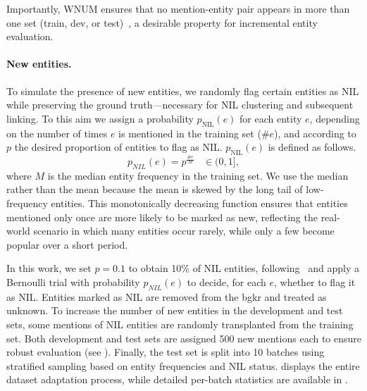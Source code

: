 Importantly, WNUM ensures that no mention-entity pair appears in more than one set (train, dev, or test)~\cite{Onoe_Durrett_2020}, a desirable property for incremental entity evaluation.

\paragraph{New entities.}
To simulate the presence of new entities, we randomly flag certain entities as NIL while preserving the ground truth---necessary for NIL clustering and subsequent linking. To this aim we assign a probability $p_\text{NIL}(e)$ for each entity $e$, depending on the number of times $e$ is mentioned in the training set ($\#e$), and according to $p$ the desired proportion of entities to flag as NIL. $p_\text{NIL}(e)$ is defined as follows.
\begin{equation}
p_{NIL}(e) = p^{\frac{\#e}{M}} \hspace{10pt} \in (0, 1],
\end{equation}
where $M$ is the median entity frequency in the training set. We use the median rather than the mean because the mean is skewed by the long tail of low-frequency entities. This monotonically decreasing function ensures that entities mentioned only once are more likely to be marked as new, reflecting the real-world scenario in which many entities occur rarely, while only a few become popular over a short period.


In this work, we set $p = 0.1$ to obtain 10\% of NIL entities, following~\cite{agarwal_2021_arborescence_arxiv} and apply a Bernoulli trial with probability $p_{NIL}(e)$ to decide, for each $e$, whether to flag it as NIL. Entities marked as NIL are removed from the \ac{bgkr} and treated as unknown. To increase the number of new entities in the development and test sets, some mentions of NIL entities are randomly transplanted from the training set. Both development and test sets are assigned 500 new mentions each to ensure robust evaluation (see ).
%
Finally, the test set is split into 10 batches using stratified sampling based on entity frequencies and NIL status.  displays the entire dataset adaptation process, while detailed per-batch statistics are available in .

